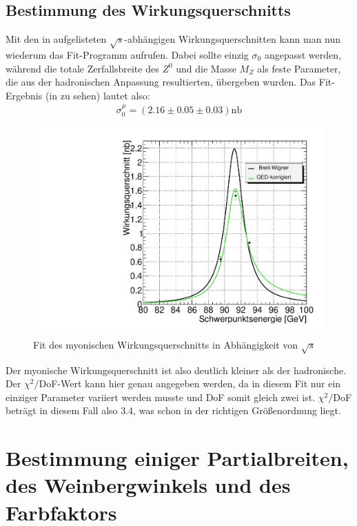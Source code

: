 \subsection{Bestimmung des Wirkungsquerschnitts}
Mit den in  aufgelisteten $\sqrt{s}$-abhängigen Wirkungsquerschnitten kann man nun wiederum das Fit-Programm aufrufen. Dabei sollte einzig $\sigma_0$ angepasst werden, während die totale Zerfallsbreite des $Z^0$ und die Masse $M_Z$ als feste Parameter, die aus der hadronischen Anpassung resultierten, übergeben wurden. Das Fit-Ergebnis (in  zu sehen) lautet also:
\begin{eqnarray}
\sigma_0^{\mu} = (2.16 \pm 0.05 \pm 0.03)\si{\nano\barn}
\end{eqnarray}
\begin{figure}[htb]
	\centering
	\includegraphics[width=1\columnwidth,keepaspectratio]{fit_muon}
	\caption{Fit des myonischen Wirkungsquerschnitts in Abhängigkeit von $\sqrt{s}$}
	\label{fig:muonfit}
\end{figure}
Der myonische Wirkungsquerschnitt ist also deutlich kleiner als der hadronische.\\
Der $\chi^2/$DoF-Wert kann hier genau angegeben werden, da in diesem Fit nur ein einziger Parameter variiert werden musste und DoF somit gleich zwei ist. $\chi^2/$DoF beträgt in diesem Fall also 3.4, was schon in der richtigen Größenordnung liegt.

\section{Bestimmung einiger Partialbreiten, des Weinbergwinkels und des Farbfaktors}
